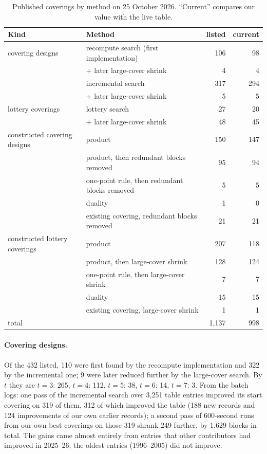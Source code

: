 \documentclass[11pt]{article}
\theoremstyle{remark}
\begin{document}
\begin{table}[t]
\centering
\begin{tabular}{llrr}
\toprule
Kind & Method & listed & current \\
\midrule
covering designs & recompute search (first implementation) & 106 & 98 \\
 & \quad + later large-cover shrink & 4 & 4 \\
 & incremental search & 317 & 294 \\
 & \quad + later large-cover shrink & 5 & 5 \\
lottery coverings & lottery search & 27 & 20 \\
 & \quad + later large-cover shrink & 48 & 45 \\
\midrule
constructed covering designs & product & 150 & 147 \\
 & product, then redundant blocks removed & 95 & 94 \\
 & one-point rule, then redundant blocks removed & 5 & 5 \\
 & duality & 1 & 0 \\
 & existing covering, redundant blocks removed & 21 & 21 \\
constructed lottery coverings & product & 207 & 118 \\
 & product, then large-cover shrink & 128 & 124 \\
 & one-point rule, then large-cover shrink & 7 & 7 \\
 & duality & 15 & 15 \\
 & existing covering, large-cover shrink & 1 & 1 \\
\midrule
total & & 1{,}137 & 998 \\
\bottomrule
\end{tabular}
\caption{Published coverings by method on 25 October 2026. ``Current'' compares our value with the live table.}
\label{tab:bymethod}
\end{table}

\paragraph{Covering designs.} Of the 432 listed, 110 were first found by the recompute implementation and 322 by the
incremental one; 9 were later reduced further by the large-cover search. By $t$ they are $t=3$: 265, $t=4$: 112,
$t=5$: 38, $t=6$: 14, $t=7$: 3. From the batch logs: one pass of the incremental search over 3{,}251 table entries
improved its start covering on 319 of them, 312 of which improved the table (188 new records and 124 improvements of
our own earlier records); a second pass of 600-second runs from our own best coverings on those 319 shrank 249 further, by 1{,}629 blocks in total. The gains came
almost entirely from entries that other contributors had improved in 2025--26; the oldest entries (1996--2005) did not
improve.
\end{document}
